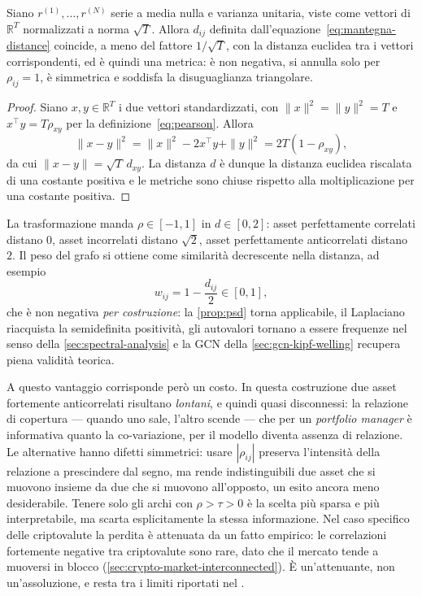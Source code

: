 \begin{proposition}
\label{prop:mantegna-metric}
Siano $r^{(1)},\dots,r^{(N)}$ serie a media nulla e varianza unitaria, viste come vettori di $\mathbb{R}^{T}$ normalizzati a norma $\sqrt{T}$. Allora $d_{ij}$ definita dall'equazione~\eqref{eq:mantegna-distance} coincide, a meno del fattore $1/\sqrt T$, con la distanza euclidea tra i vettori corrispondenti, ed è quindi una metrica: è non negativa, si annulla solo per $\rho_{ij}=1$, è simmetrica e soddisfa la disuguaglianza triangolare.
\end{proposition}

\begin{proof}
Siano $x,y\in\mathbb{R}^T$ i due vettori standardizzati, con $\|x\|^2=\|y\|^2=T$ e $x^\top y = T\rho_{xy}$ per la definizione~\eqref{eq:pearson}. Allora
$$\|x-y\|^2 = \|x\|^2 - 2x^\top y + \|y\|^2 = 2T\left(1-\rho_{xy}\right),$$
da cui $\|x-y\| = \sqrt{T}\,d_{xy}$. La distanza $d$ è dunque la distanza euclidea riscalata di una costante positiva e le metriche sono chiuse rispetto alla moltiplicazione per una costante positiva. \qedhere
\end{proof}

La trasformazione manda $\rho\in[-1,1]$ in $d\in[0,2]$: asset perfettamente correlati distano $0$, asset incorrelati distano $\sqrt2$, asset perfettamente anticorrelati distano $2$. Il peso del grafo si ottiene come similarità decrescente nella distanza, ad esempio
\begin{equation}
\label{eq:mantegna-weight}
w_{ij} = 1 - \frac{d_{ij}}{2} \in [0,1],
\end{equation}
che è non negativa \emph{per costruzione}: la \cref{prop:psd} torna applicabile, il Laplaciano riacquista la semidefinita positività, gli autovalori tornano a essere frequenze nel senso della \cref{sec:spectral-analysis} e la GCN della \cref{sec:gcn-kipf-welling} recupera piena validità teorica.

A questo vantaggio corrisponde però un costo. In questa costruzione due asset fortemente anticorrelati risultano \emph{lontani}, e quindi quasi disconnessi: la relazione di copertura — quando uno sale, l'altro scende — che per un \emph{portfolio manager} è informativa quanto la co-variazione, per il modello diventa assenza di relazione. Le alternative hanno difetti simmetrici: usare $|\rho_{ij}|$ preserva l'intensità della relazione a prescindere dal segno, ma rende indistinguibili due asset che si muovono insieme da due che si muovono all'opposto, un esito ancora meno desiderabile. Tenere solo gli archi con $\rho>\tau>0$ è la scelta più sparsa e più interpretabile, ma scarta esplicitamente la stessa informazione. Nel caso specifico delle criptovalute la perdita è attenuata da un fatto empirico: le correlazioni fortemente negative tra criptovalute sono rare, dato che il mercato tende a muoversi in blocco (\cref{sec:crypto-market-interconnected}). È un'attenuante, non un'assoluzione, e resta tra i limiti riportati nel .

